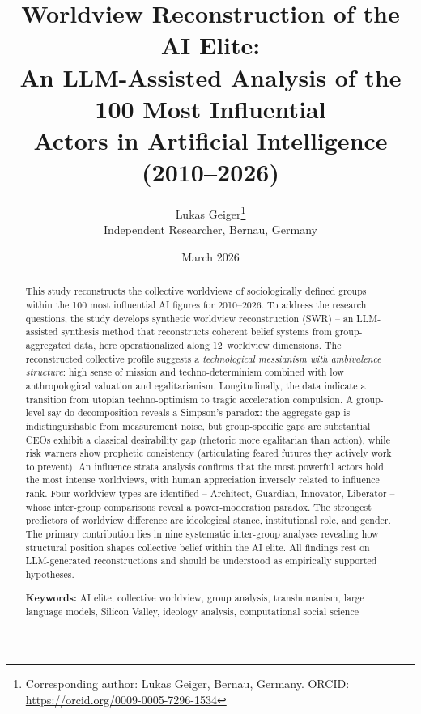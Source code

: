 \documentclass[12pt,a4paper]{article}
\title{%
  \sffamily\bfseries
  Worldview Reconstruction of the AI Elite:\\[0.3em]
  \large An LLM-Assisted Analysis of the 100 Most Influential\\
  Actors in Artificial Intelligence (2010--2026)%
}
\author{%
  Lukas Geiger\thanks{Corresponding author: Lukas Geiger, Bernau, Germany. ORCID: \url{https://orcid.org/0009-0005-7296-1534}}\\[0.3em]
  \small Independent Researcher, Bernau, Germany
}
\date{March 2026}
\begin{document}


\maketitle
\thispagestyle{empty}

\begin{abstract}
\noindent
This study reconstructs the collective worldviews of sociologically defined groups within the 100 most influential AI figures for 2010--2026. To address the research questions, the study develops synthetic worldview reconstruction (SWR) -- an LLM-assisted synthesis method that reconstructs coherent belief systems from group-aggregated data, here operationalized along 12~worldview dimensions. The reconstructed collective profile suggests a \emph{technological messianism with ambivalence structure}: high sense of mission and techno-determinism combined with low anthropological valuation and egalitarianism. Longitudinally, the data indicate a transition from utopian techno-optimism to tragic acceleration compulsion. A group-level say-do decomposition reveals a Simpson's paradox: the aggregate gap is indistinguishable from measurement noise, but group-specific gaps are substantial -- CEOs exhibit a classical desirability gap (rhetoric more egalitarian than action), while risk warners show prophetic consistency (articulating feared futures they actively work to prevent). An influence strata analysis confirms that the most powerful actors hold the most intense worldviews, with human appreciation inversely related to influence rank. Four worldview types are identified -- Architect, Guardian, Innovator, Liberator -- whose inter-group comparisons reveal a power-moderation paradox. The strongest predictors of worldview difference are ideological stance, institutional role, and gender. The primary contribution lies in nine systematic inter-group analyses revealing how structural position shapes collective belief within the AI elite. All findings rest on LLM-generated reconstructions and should be understood as empirically supported hypotheses.

\medskip
\noindent\textbf{Keywords:} AI elite, collective worldview, group analysis, transhumanism, large language models, Silicon Valley, ideology analysis, computational social science
\end{abstract}
\end{document}
